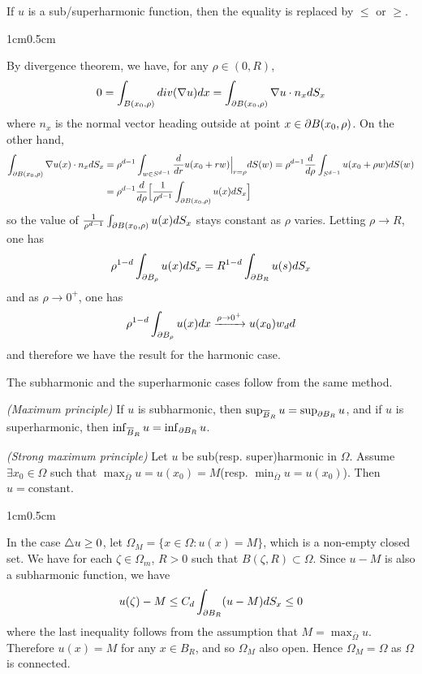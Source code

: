 \documentclass[12pt,a4paper]{article}
\newenvironment{proof}
{\begin{changemargin}{1cm}{0.5cm} 
	}%
	{\end{changemargin}
}
\newenvironment{p}
{\begin{proof} 
	}%
	{\end{proof}
}
\begin{document}
\quad If $u$ is a sub/superharmonic function, then the equality is replaced by $\leq$ or $\geq$.
\begin{p}
\pf By divergence theorem, we have, for any $\rho \in (0, R)$,
\begin{align*}
0= \int_{B(x_0, \rho)} div(\nabla u) dx = \int_{\partial B(x_0, \rho)} \nabla u \cdot n_x dS_x
\end{align*}
where $n_x$ is the normal vector heading outside at point $x\in \partial B(x_0, \rho)$. On the other hand, \begin{align*}
\int_{\partial B(x_0, \rho)} \nabla u(x) \cdot n_x dS_x & = \rho^{d-1} \int_{w \in S^{d-1} } \frac{d}{dr} u(x_0 + rw)\Big|_{r=\rho} dS(w) = \rho^{d-1} \frac{d}{d\rho} \int_{ S^{d-1} } u(x_0 + \rho w) dS(w) \\
& = \rho^{d-1} \frac{d}{d\rho} \Big[ \frac{1}{\rho^{d-1}} \int_{\partial B(x_0 , \rho)} u(x) dS_x \Big]
\end{align*}
so the value of $\frac{1}{\rho^{d-1}} \int_{\partial B(x_0 , \rho)} u(x) dS_x$ stays constant as $\rho$ varies. Letting $\rho \rightarrow R$, one has
\begin{align*}
\rho^{1-d} \int_{\partial B_{\rho}} u(x) dS_x = R^{1-d} \int_{\partial B_R} u(s) dS_x
\end{align*}
and as $\rho \rightarrow 0^+$, one has
\begin{align*}
\rho^{1-d} \int_{\partial B_{\rho}} u(x) dx \xrightarrow{\rho \rightarrow 0^+} u(x_0) w_d d
\end{align*}
and therefore we have the result for the harmonic case.

\quad The subharmonic and the superharmonic cases follow from the same method.

\eop
\end{p}
\s

 \emph{(Maximum principle)} If $u$ is subharmonic, then $\sup_{\overline{B}_R} u = \sup_{\partial B_R} u$, and if $u$ is superharmonic, then $\inf_{\overline{B}_R} u = \inf_{\partial B_R} u$.
\s

 \emph{(Strong maximum principle)} Let $u$ be sub(resp. super)harmonic in $\Omega$. Assume $\exists x_0 \in \Omega$ such that $\max_{\bar{\Omega}} u = u(x_0) = M$(resp. $\min_{\bar{\Omega}} u = u(x_0)$). Then $u = \text{constant}$.
\begin{p}
\pf In the case $\triangle u \geq 0$, let $\Omega_M = \{x\in \Omega : u(x) = M \}$, which is a non-empty closed set. We have for each $\zeta \in \Omega_m$, $R>0$ such that $B(\zeta, R) \subset \Omega$. Since $u-M$ is also a subharmonic function, we have 
\begin{align*}
u(\zeta) -M \leq C_d \int_{\partial B_R} (u-M) dS_x \leq 0
\end{align*}
where the last inequality follows from the assumption that $M = \max_{\bar{\Omega}} u$. Therefore $u(x) =M$ for any $x \in B_R$, and so $\Omega_M$ also open. Hence $\Omega_M = \Omega$ as $\Omega$ is connected.

\eop
\end{p}
\s
\end{document}
